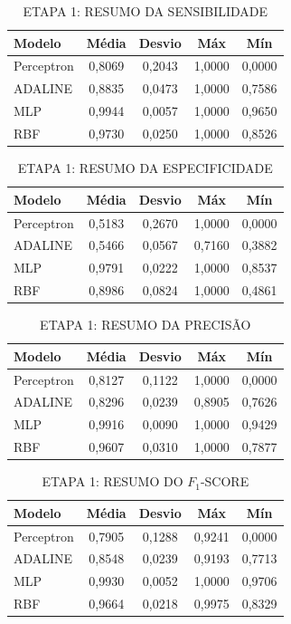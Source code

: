\documentclass[journal,onecolumn]{IEEEtran}
\begin{document}
\begin{table}[H]
\renewcommand{\arraystretch}{1.2}
\caption{ETAPA 1: RESUMO DA SENSIBILIDADE}
\centering
\begin{tabular}{lcccc}
\hline
\textbf{Modelo} & \textbf{Média} & \textbf{Desvio} & \textbf{Máx} & \textbf{Mín} \\ \hline
Perceptron & 0,8069 & 0,2043 & 1,0000 & 0,0000 \\
ADALINE & 0,8835 & 0,0473 & 1,0000 & 0,7586 \\
MLP & 0,9944 & 0,0057 & 1,0000 & 0,9650 \\
RBF & 0,9730 & 0,0250 & 1,0000 & 0,8526 \\ \hline
\end{tabular}
\end{table}

\begin{table}[H]
\renewcommand{\arraystretch}{1.2}
\caption{ETAPA 1: RESUMO DA ESPECIFICIDADE}
\centering
\begin{tabular}{lcccc}
\hline
\textbf{Modelo} & \textbf{Média} & \textbf{Desvio} & \textbf{Máx} & \textbf{Mín} \\ \hline
Perceptron & 0,5183 & 0,2670 & 1,0000 & 0,0000 \\
ADALINE & 0,5466 & 0,0567 & 0,7160 & 0,3882 \\
MLP & 0,9791 & 0,0222 & 1,0000 & 0,8537 \\
RBF & 0,8986 & 0,0824 & 1,0000 & 0,4861 \\ \hline
\end{tabular}
\end{table}

\begin{table}[H]
\renewcommand{\arraystretch}{1.2}
\caption{ETAPA 1: RESUMO DA PRECISÃO}
\centering
\begin{tabular}{lcccc}
\hline
\textbf{Modelo} & \textbf{Média} & \textbf{Desvio} & \textbf{Máx} & \textbf{Mín} \\ \hline
Perceptron & 0,8127 & 0,1122 & 1,0000 & 0,0000 \\
ADALINE & 0,8296 & 0,0239 & 0,8905 & 0,7626 \\
MLP & 0,9916 & 0,0090 & 1,0000 & 0,9429 \\
RBF & 0,9607 & 0,0310 & 1,0000 & 0,7877 \\ \hline
\end{tabular}
\end{table}

\begin{table}[H]
\renewcommand{\arraystretch}{1.2}
\caption{ETAPA 1: RESUMO DO $F_{1}$-SCORE}
\centering
\begin{tabular}{lcccc}
\hline
\textbf{Modelo} & \textbf{Média} & \textbf{Desvio} & \textbf{Máx} & \textbf{Mín} \\ \hline
Perceptron & 0,7905 & 0,1288 & 0,9241 & 0,0000 \\
ADALINE & 0,8548 & 0,0239 & 0,9193 & 0,7713 \\
MLP & 0,9930 & 0,0052 & 1,0000 & 0,9706 \\
RBF & 0,9664 & 0,0218 & 0,9975 & 0,8329 \\ \hline
\end{tabular}
\end{table}
\end{document}
